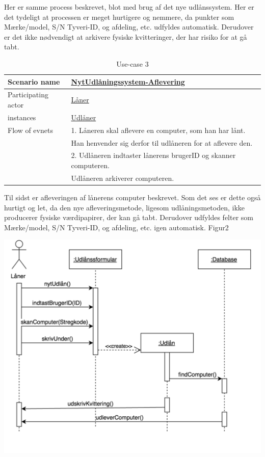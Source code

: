 \documentclass[a4paper]{article}
\begin{document}
Her er samme process beskrevet, blot med brug af det nye udlånssystem. Her er det tydeligt at processen er meget hurtigere og nemmere, da punkter som Mærke/model, S/N Tyveri-ID, og afdeling, etc. udfyldes automatisk. Derudover er det ikke nødvendigt at arkivere fysiske kvitteringer, der har risiko for at gå tabt.
\newpage
\begin{table}[h]
\caption{Use-case 3}
\begin{tabular}{ll}
Scenario name                 & \underline{NytUdlåningssystem-Aflevering} \\ \hline
Participating actor           & \underline{Låner} \\
instances                     & \underline{Udlåner}\\ \hline
Flow of evnets                & 1. Låneren skal aflevere en computer, som han har lånt.
\\& Han henvender sig derfor til udlåneren for at aflevere den.
\\& 2. Udlåneren indtaster lånerens brugerID og skanner computeren.
\\& Udlåneren arkiverer computeren.
\end{tabular}
\end{table}
Til sidst er afleveringen af lånerens computer beskrevet. Som det ses er dette også hurtigt og let, da den nye afleveringsmetode, ligesom udlåningsmetoden, ikke producerer fysiske værdipapirer, der kan gå tabt. Derudover udfyldes felter som Mærke/model, S/N Tyveri-ID, og afdeling, etc. igen automatisk.
\newpage
Figur2\\
\centerline{\includegraphics[scale=0.5]{Sekvensdiagram2.png}}
\end{document}

